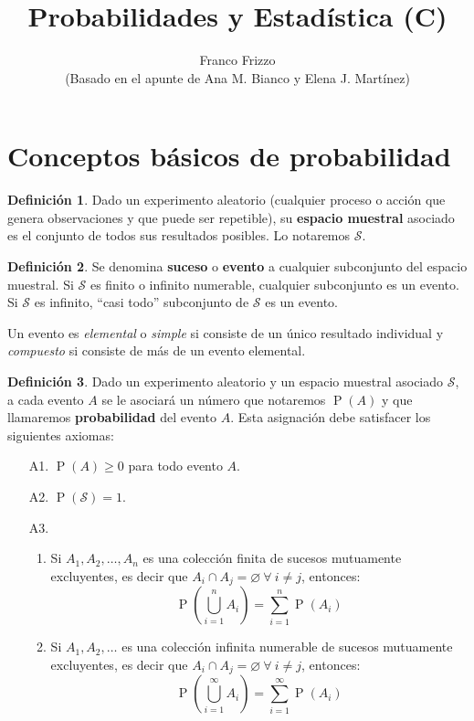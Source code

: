 \documentclass[11pt]{article}
\theoremstyle{plain}
\theoremstyle{definition}
\newtheorem*{defi}{Definición}
\theoremstyle{remark}
\newcommand{\deft}[1]{\textbf{#1}}  %
\newcommand{\proba}{\ensuremath{\operatorname{P}}}  %
\newcommand{\espm}[0]{\ensuremath{\mathcal{S}}}  %
\newcommand{\foralle}{\ensuremath{\forall \ }}  %
\begin{document}
 
\title{Probabilidades y Estadística (C)}
\author{Franco Frizzo \\ \small (Basado en el apunte de Ana M. Bianco y Elena J. Martínez)}
\date{}
\maketitle
\tableofcontents
\newpage

\section{Conceptos básicos de probabilidad} 

  \begin{defi}
    Dado un experimento aleatorio (cualquier proceso o acción que genera observaciones y que puede ser repetible), su \deft{espacio muestral} asociado es el conjunto de todos sus resultados posibles. Lo notaremos $\espm$.
  \end{defi}

  \begin{defi}
    Se denomina \deft{suceso} o \deft{evento} a cualquier subconjunto del espacio muestral. Si $\espm$ es finito o infinito numerable, cualquier subconjunto es un evento. Si $\espm$ es infinito, “casi todo” subconjunto de $\espm$ es un evento.
    
    Un evento es \emph{elemental} o \emph{simple} si consiste de un único resultado individual y \emph{compuesto} si consiste de más de un evento elemental. 
  \end{defi}

  \begin{defi}
    Dado un experimento aleatorio y un espacio muestral asociado $\espm$, a cada evento $A$ se le asociará un número que notaremos $\proba(A)$ y que llamaremos \deft{probabilidad} del evento $A$. Esta asignación debe satisfacer los siguientes axiomas:
    \begin{enumerate}
      \item[A1.] $\proba(A) \geq 0$ para todo evento $A$.
      \item[A2.] $\proba(\espm) = 1$.
      \item[A3.] \begin{enumerate}
        \item Si $A_1, A_2, \dots, A_n$ es una colección finita de sucesos mutuamente excluyentes, es decir que $A_i \cap A_j = \varnothing \ \foralle i \neq j$, entonces:
        \[ \proba\left( \bigcup_{i=1}^n A_i \right) = \sum_{i=1}^n \proba(A_i) \]
        \item Si $A_1, A_2, \dots$ es una colección infinita numerable de sucesos mutuamente excluyentes, es decir que $A_i \cap A_j = \varnothing \ \foralle i \neq j$, entonces:
        \[ \proba\left( \bigcup_{i=1}^\infty A_i \right) = \sum_{i=1}^\infty \proba(A_i) \]
      \end{enumerate}
    \end{enumerate}
  \end{defi}
\end{document}

